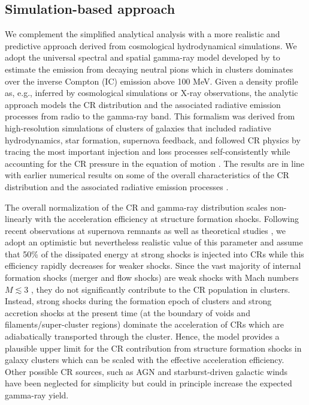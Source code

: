 \documentclass[12pt,manuscript]{aastex}
\begin{document}
%
%

\subsection{Simulation-based approach}
\label{sec:simulation}
We complement the simplified analytical analysis with a more realistic and predictive approach
derived from cosmological hydrodynamical simulations. We adopt the universal spectral and spatial
gamma-ray model developed by \citet{article:PinzkePfrommer:2010} to estimate the emission from
decaying neutral pions which in clusters dominates over the inverse Compton (IC) emission above
100 MeV. Given a density profile as, e.g., inferred by
cosmological simulations or X-ray observations, the analytic approach models the CR distribution and
the associated radiative emission processes from radio to the gamma-ray band. This formalism was
derived from high-resolution simulations of clusters of galaxies that included radiative
hydrodynamics,
star formation, supernova feedback, and followed CR physics by tracing the most important injection
and loss processes self-consistently while accounting for the CR pressure in the equation of motion
\citep{article:PfrommerSpringelEnsslinJubelgas, article:EnsslinPfrommerSpringelJubelgas:2007,
article:JubelgasSpringelEnsslinPfrommer:2008}. The results are in line with earlier numerical
results on some of the overall characteristics of the CR distribution and the associated radiative
emission processes \citep{article:DolagEnsslin:2000, article:MiniatiRyuKangJones:2001,
article:Miniati:2003, article:Pfrommer_etal:2007, article:PfrommerEnsslinSpringel:2008,
article:Pfrommer:2008}.
 
The overall normalization of the CR and gamma-ray distribution scales non-linearly with the
acceleration efficiency at structure formation shocks. Following recent observations at supernova
remnants \citep{article:Helder_etal:2009} as well as theoretical studies
\citep{article:KangJones:2005}, we adopt an optimistic but nevertheless realistic value of this
parameter and assume that 50\% of the dissipated energy at strong shocks is injected into CRs while
this efficiency rapidly decreases for weaker shocks. Since the vast majority of internal formation
shocks (merger and flow shocks) are weak shocks with Mach numbers $M\lesssim3$
\citep[e.g.,][]{article:Ryu_etal:2003}, they do not significantly contribute to the CR population in
clusters. Instead, strong shocks during the formation epoch of clusters and strong accretion shocks
at the present time (at the boundary of voids and filaments/super-cluster regions) dominate the
acceleration of CRs which are adiabatically transported through the cluster. Hence, the
model provides a plausible upper limit for the CR contribution from structure formation shocks in
galaxy clusters which can be scaled with the effective acceleration efficiency. Other possible CR
sources, such as AGN and starburst-driven galactic winds have been neglected for simplicity but
could in principle increase the expected gamma-ray yield.
\end{document}
